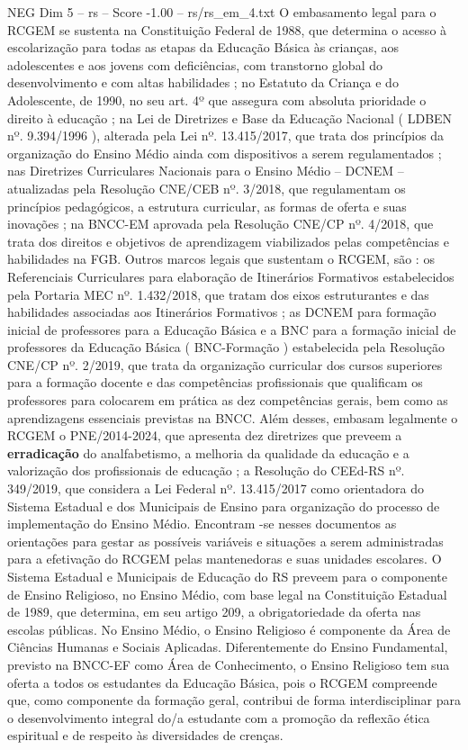 \begin{textsample}{NEG Dim 5 – rs – Score -1.00 – rs/rs\_em\_4.txt}
O embasamento legal para o RCGEM se sustenta na Constituição Federal de 1988, que determina o acesso à escolarização para todas as etapas da Educação Básica às crianças, aos adolescentes e aos jovens com deficiências, com transtorno global do desenvolvimento e com altas habilidades ; no Estatuto da Criança e do Adolescente, de 1990, no seu art. 4º que assegura com absoluta prioridade o direito à educação ; na Lei de Diretrizes e Base da Educação Nacional ( LDBEN nº. 9.394/1996 ), alterada pela Lei nº. 13.415/2017, que trata dos princípios da organização do Ensino Médio ainda com dispositivos a serem regulamentados ; nas Diretrizes Curriculares Nacionais para o Ensino Médio – DCNEM – atualizadas pela Resolução CNE/CEB nº. 3/2018, que regulamentam os princípios pedagógicos, a estrutura curricular, as formas de oferta e suas inovações ; na BNCC-EM aprovada pela Resolução CNE/CP nº. 4/2018, que trata dos direitos e objetivos de aprendizagem viabilizados pelas competências e habilidades na FGB.
Outros marcos legais que sustentam o RCGEM, são : os Referenciais Curriculares para elaboração de Itinerários Formativos estabelecidos pela Portaria MEC nº. 1.432/2018, que tratam dos eixos estruturantes e das habilidades associadas aos Itinerários Formativos ; as DCNEM para formação inicial de professores para a Educação Básica e a BNC para a formação inicial de professores da Educação Básica ( BNC-Formação ) estabelecida pela Resolução CNE/CP nº. 2/2019, que trata da organização curricular dos cursos superiores para a formação docente e das competências profissionais que qualificam os professores para colocarem em prática as dez competências gerais, bem como as aprendizagens essenciais previstas na BNCC.
Além desses, embasam legalmente o RCGEM o PNE/2014-2024, que apresenta dez diretrizes que preveem a \textbf{erradicação} do analfabetismo, a melhoria da qualidade da educação e a valorização dos profissionais de educação ; a Resolução do CEEd-RS nº. 349/2019, que considera a Lei Federal nº. 13.415/2017 como orientadora do Sistema Estadual e dos Municipais de Ensino para organização do processo de implementação do Ensino Médio.
Encontram -se nesses documentos as orientações para gestar as possíveis variáveis e situações a serem administradas para a efetivação do RCGEM pelas mantenedoras e suas unidades escolares.
O Sistema Estadual e Municipais de Educação do RS preveem para o componente de Ensino Religioso, no Ensino Médio, com base legal na Constituição Estadual de 1989, que determina, em seu artigo 209, a obrigatoriedade da oferta nas escolas públicas.
No Ensino Médio, o Ensino Religioso é componente da Área de Ciências Humanas e Sociais Aplicadas.
Diferentemente do Ensino Fundamental, previsto na BNCC-EF como Área de Conhecimento, o Ensino Religioso tem sua oferta a todos os estudantes da Educação Básica, pois o RCGEM compreende que, como componente da formação geral, contribui de forma interdisciplinar para o desenvolvimento integral do/a estudante com a promoção da reflexão ética espiritual e de respeito às diversidades de crenças.

\end{textsample}

